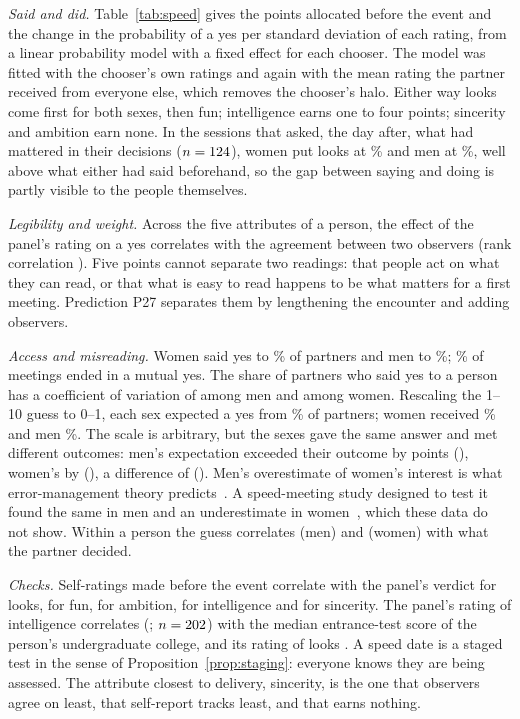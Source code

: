 \emph{Said and did.} Table~\ref{tab:speed} gives the points allocated before the event and the change in the probability
of a yes per standard deviation of each rating, from a linear probability model with a fixed effect for each chooser. The
model was fitted with the chooser's own ratings and again with the mean rating the partner received from everyone else,
which removes the chooser's halo. Either way looks come first for both sexes, then fun; intelligence earns one to four
points; sincerity and ambition earn none. In the sessions that asked, the day after, what had mattered in their decisions
($n=124$), women put looks at \SdAftAttW\% and men at \SdAftAttM\%, well above what either had said beforehand, so the
gap between saying and doing is partly visible to the people themselves.

\emph{Legibility and weight.} Across the five attributes of a person, the effect of the panel's rating on a yes
correlates \SdLegPear{} with the agreement between two observers (rank correlation \SdLegSpear). Five points cannot
separate two readings: that people act on what they can read, or that what is easy to read happens to be what matters for
a first meeting. Prediction P27 separates them by lengthening the encounter and adding observers.

\emph{Access and misreading.} Women said yes to \SdYesW\% of partners and men to \SdYesM\%; \SdMatch\% of meetings ended
in a mutual yes. The share of partners who said yes to a person has a coefficient of variation of \SdPopCVM{} among men
and \SdPopCVW{} among women. Rescaling the 1--10 guess to 0--1, each sex expected a yes from \SdExpW\% of partners; women
received \SdActW\% and men \SdActM\%. The scale is arbitrary, but the sexes gave the same answer and met different
outcomes: men's expectation exceeded their outcome by \SdGapM{} points (\SdGapMCI), women's by \SdGapW{} (\SdGapWCI), a
difference of \SdGapDiff{} (\SdGapDiffCI). Men's overestimate of women's interest is what error-management theory predicts~\cite{haselton2000}. A speed-meeting
study designed to test it found the same in men and an underestimate in women~\cite{perilloux2012}, which these data do
not show. Within a person the guess correlates \SdAccM{} (men) and \SdAccW{} (women) with what the
partner decided.

\emph{Checks.} Self-ratings made before the event correlate \SdSelfAtt{} with the panel's verdict for looks, \SdSelfFun{}
for fun, \SdSelfAmb{} for ambition, \SdSelfInt{} for intelligence and \SdSelfSin{} for sincerity. The panel's rating of
intelligence correlates \SdSat{} (\SdSatCI; $n=202$) with the median entrance-test score of the person's undergraduate
college, and its rating of looks \SdSatAtt. A speed date is a staged test in the sense of
Proposition~\ref{prop:staging}: everyone knows they are being assessed. The attribute closest to delivery, sincerity, is
the one that observers agree on least, that self-report tracks least, and that earns nothing.

